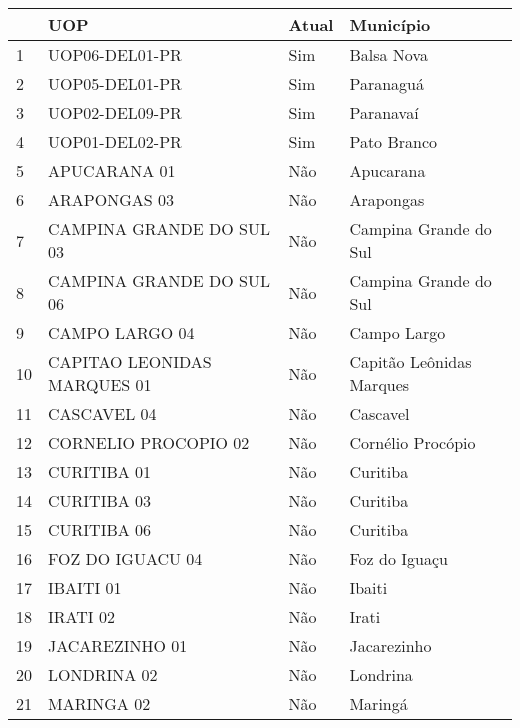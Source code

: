 {\begin{tabular}{l|l|l|l}\hline
      & UOP & Atual & Município \\ \hline\hline
    1 &               UOP06-DEL01-PR &   Sim &                Balsa Nova \\
    2 &               UOP05-DEL01-PR &   Sim &                 Paranaguá \\
    3 &               UOP02-DEL09-PR &   Sim &                 Paranavaí \\
    4 &               UOP01-DEL02-PR &   Sim &               Pato Branco \\
    5 &                 APUCARANA 01 &   Não &                 Apucarana \\
    6 &                 ARAPONGAS 03 &   Não &                 Arapongas \\
    7 &     CAMPINA GRANDE DO SUL 03 &   Não &     Campina Grande do Sul \\
    8 &     CAMPINA GRANDE DO SUL 06 &   Não &     Campina Grande do Sul \\
    9 &               CAMPO LARGO 04 &   Não &               Campo Largo \\
    10 &  CAPITAO LEONIDAS MARQUES 01 &   Não &  Capitão Leônidas Marques \\
    11 &                  CASCAVEL 04 &   Não &                  Cascavel \\
    12 &         CORNELIO PROCOPIO 02 &   Não &         Cornélio Procópio \\
    13 &                  CURITIBA 01 &   Não &                  Curitiba \\
    14 &                  CURITIBA 03 &   Não &                  Curitiba \\
    15 &                  CURITIBA 06 &   Não &                  Curitiba \\
    16 &             FOZ DO IGUACU 04 &   Não &             Foz do Iguaçu \\
    17 &                    IBAITI 01 &   Não &                    Ibaiti \\
    18 &                     IRATI 02 &   Não &                     Irati \\
    19 &               JACAREZINHO 01 &   Não &               Jacarezinho \\
    20 &                  LONDRINA 02 &   Não &                  Londrina \\
    21 &                   MARINGA 02 &   Não &                   Maringá \\

\end{tabular}}
